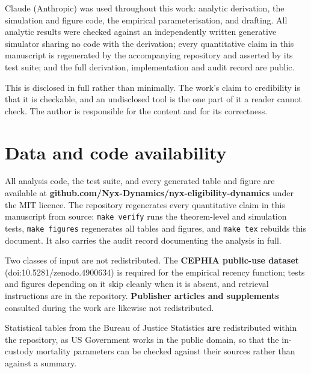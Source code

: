 Claude (Anthropic) was used throughout this work: analytic derivation, the simulation and figure code, the empirical parameterisation, and drafting. All analytic results were checked against an independently written generative simulator sharing no code with the derivation; every quantitative claim in this manuscript is regenerated by the accompanying repository and asserted by its test suite; and the full derivation, implementation and audit record are public.

This is disclosed in full rather than minimally. The work's claim to credibility is that it is checkable, and an undisclosed tool is the one part of it a reader cannot check. The author is responsible for the content and for its correctness.

\section{Data and code availability}

All analysis code, the test suite, and every generated table and figure are available at \textbf{github.com/Nyx-Dynamics/nyx-eligibility-dynamics} under the MIT licence. The repository regenerates every quantitative claim in this manuscript from source: \texttt{make\ verify} runs the theorem-level and simulation tests, \texttt{make\ figures} regenerates all tables and figures, and \texttt{make\ tex} rebuilds this document. It also carries the audit record documenting the analysis in full.

Two classes of input are not redistributed. The \textbf{CEPHIA public-use dataset} (doi:10.5281/zenodo.4900634) is required for the empirical recency function; tests and figures depending on it skip cleanly when it is absent, and retrieval instructions are in the repository. \textbf{Publisher articles and supplements} consulted during the work are likewise not redistributed.

Statistical tables from the Bureau of Justice Statistics \textbf{are} redistributed within the repository, as US Government works in the public domain, so that the in-custody mortality parameters can be checked against their sources rather than against a summary.
